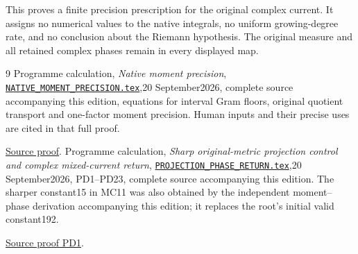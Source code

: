 \documentclass[11pt]{article}
\begin{document}
This proves a finite precision prescription for the original complex
current. It assigns no numerical values to the native integrals, no
uniform growing-degree rate, and no conclusion about the Riemann
hypothesis. The original measure and all retained complex phases remain
in every displayed map.
\begin{thebibliography}{9}
Programme calculation, \emph{Native moment precision},
\href{https://github.com/KokunoYumeto/zeta-function-research-reader/blob/5992ad50c0f2a06921f1fcaded7b4e38097c0739/workbenches/splitzero-tandem/continuations/20260920-original-kernel-mixed-determinants/providers/NATIVE_MOMENT_PRECISION.tex\#L1}{\texttt{NATIVE\_MOMENT\_PRECISION.tex}},20 September2026,
complete source accompanying this edition, equations for interval
Gram floors, original quotient transport and one-factor moment precision.
Human inputs and their precise uses are cited in that full proof.

\href{https://github.com/KokunoYumeto/zeta-function-research-reader/blob/5992ad50c0f2a06921f1fcaded7b4e38097c0739/workbenches/splitzero-tandem/continuations/20260920-original-kernel-mixed-determinants/providers/NATIVE_MOMENT_PRECISION.tex\#L1}{Source proof}.
Programme calculation, \emph{Sharp original-metric
projection control and complex mixed-current return},
\href{https://github.com/KokunoYumeto/zeta-function-research-reader/blob/5992ad50c0f2a06921f1fcaded7b4e38097c0739/workbenches/splitzero-tandem/continuations/20260920-original-kernel-mixed-determinants/providers/PROJECTION_PHASE_RETURN.tex\#L1}{\texttt{PROJECTION\_PHASE\_RETURN.tex}},20 September2026, PD1--PD23,
complete source accompanying this edition. The sharper constant15 in
MC11 was also obtained by the independent moment--phase derivation
accompanying this edition; it replaces the root's initial valid constant192.

\href{https://github.com/KokunoYumeto/zeta-function-research-reader/blob/5992ad50c0f2a06921f1fcaded7b4e38097c0739/workbenches/splitzero-tandem/continuations/20260920-original-kernel-mixed-determinants/providers/PROJECTION_PHASE_RETURN.tex\#L25}{Source proof PD1}.
\end{thebibliography}
\end{document}
